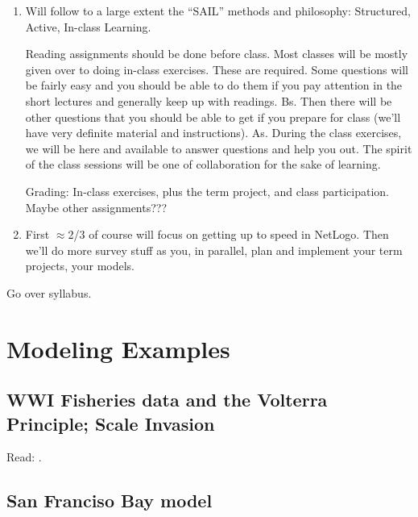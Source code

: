 \begin{enumerate}
\item Will follow to a large extent the ``SAIL'' methods and
  philosophy: Structured, Active, In-class Learning.

Reading assignments should be done before class.
Most classes will be mostly given over to doing in-class exercises. These
are required. Some questions will be fairly easy and you should be
able to do them if you pay attention in the short lectures and
generally keep up with readings. Bs. Then there will be other
questions that you should be able to get if you prepare for class
(we'll have very definite material and instructions). As. During the
class exercises, we will be here and available to answer questions and
help you out. The spirit of the class sessions will be one of
collaboration for the sake of learning.

Grading: In-class exercises, plus the term project, and class
participation.
Maybe other assignments???

\item First $\approx$2/3 of course will focus on getting up to speed in
  NetLogo. Then we'll do more survey stuff as you, in parallel, plan
  and implement your term projects, your models.
\end{enumerate}

\noindent Go over syllabus.


\section{Modeling Examples}


\subsection{ WWI Fisheries data and the Volterra Principle; Scale
  Invasion}

 Read: \citet[chapters 1 and 2]{weisberg_2013}.

\subsection{San Franciso Bay model}


